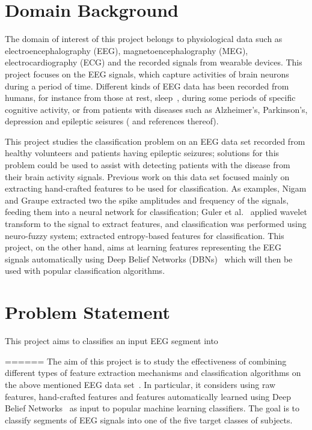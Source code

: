 \documentclass[12pt]{article}
\begin{document}
\maketitle

\section{Domain Background}

\noindent
The domain of interest of this project belongs to physiological data such as electroencephalography (EEG), magnetoencephalography (MEG), electrocardiography (ECG) and the recorded signals from wearable devices. This project focuses on the EEG signals, which capture activities of brain neurons during a period of time. Different kinds of EEG data has been recorded from humans, for instance from those at rest, sleep~\cite{langkvist2012sleep}, during some periods of specific cognitive activity, or from patients with diseases such as Alzheimer's, Parkinson's, depression and epileptic seisures (\cite{andrzejak2001indications} and references thereof).

This project studies the classification problem on an EEG data set recorded from healthy volunteers and patients having epileptic seizures; solutions for this problem could be used to assist with detecting patients with the disease from their brain activity signals. Previous work on this data set focused mainly on extracting hand-crafted features to be used for classification. As examples, Nigam and Graupe \cite{nigam2004neural} extracted two the spike amplitudes and frequency of the signals, feeding them into a neural network for classification; Guler et al.~\cite{guler2005recurrent} applied wavelet transform to the signal to extract features, and classification was performed using neuro-fuzzy system; \cite{kannathal2005entropies} extracted entropy-based features for classification. This project, on the other hand, aims at learning features representing the EEG signals automatically using Deep Belief Networks (DBNs)~\cite{hinton2006reducing} which will then be used with popular classification algorithms.

\section{Problem Statement}

This project aims to classifies an input EEG segment into 

======
The aim of this project is to study the effectiveness of combining different types of feature extraction mechanisms and classification algorithms on the above mentioned EEG data set~\cite{andrzejak2001indications}. In particular, it considers using raw features, hand-crafted features and features automatically learned using Deep Belief Networks~\cite{hinton2006reducing} as input to popular machine learning classifiers. The goal is to classify segments of EEG signals into one of the five target classes of subjects.
\end{document}
